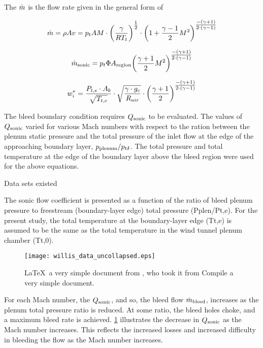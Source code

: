 \documentclass{article}
\begin{document}
The $\dot{m}$ is the flow rate given in the general form of


$$ \dot{m} = \rho A v = p_t A M \cdot \qty(\frac{\gamma}{RT_t})^{\textstyle\frac{1}{2}} \cdot \qty(1 + \frac{\gamma-1}{2}M^2)^{\textstyle\frac{-\qty(\gamma+1)}{2\cdot\qty(\gamma-1)}} $$

$$ \dot{m}_{\textrm{sonic}} = p_t \Phi A_{\textrm{region}} \qty(\frac{\gamma+1}{2}M^2)^{\textstyle\frac{-\qty(\gamma+1)}{2\cdot\qty(\gamma-1)}} $$

$$ w_i^* = \frac{P_{t,e}\cdot A_b }{\sqrt{T_{t,e}}} \cdot \sqrt{\frac{\gamma\cdot g_c}{R_{air}}} \cdot \qty(\frac{\gamma+1}{2})^{\textstyle\frac{-\qty(\gamma+1)}{2\cdot\qty(\gamma-1)}} $$

The bleed boundary condition requires $Q_{\textrm{sonic}}$ to be evaluated. The values of $Q_{\textrm{sonic}}$ varied for various Mach numbers with respect to the ration between the plenum static pressure and the total pressure of the inlet flow at the edge of the approaching boundary layer, $p_{\textrm{plenum}}/p_{t\delta}$. The total pressure and total temperature at the edge of the boundary layer above the bleed region were used for the above equations.

Data sets existed

The sonic flow coefficient is presented as a function of the ratio of bleed plenum pressure to freestream (boundary-layer edge) total pressure (Pplen/Pt,e). For the present study, the total temperature at the boundary-layer edge (Tt,e) is assumed to be the same as the total temperature in the wind tunnel plenum chamber (Tt,0).

\begin{figure}[htbp]
 \begin{center}
    \texttt{[image: willis\_data\_uncollapsed.eps]}
     \caption{\LaTeX\ a very simple document from \cite{Slater2012}, who took it from \cite{Willis1995} Compile a very simple document.}
     \label{fig:MyFirstLaTeX}
 \end{center}
\end{figure}

For each Mach number, the $Q_{\textrm{sonic}}$, and so, the bleed flow $\dot{m}_{\textrm{bleed}}$, increases as the plenum total pressure ratio is reduced. At some ratio, the bleed holes choke, and a maximum bleed rate is achieved. \cref{fig:MyFirstLaTeX} illustrates the decrease in $Q_{\textrm{sonic}}$ as the Mach number increases. This reflects the increased losses and increased difficulty in bleeding the flow as the Mach number increases.
\end{document}
